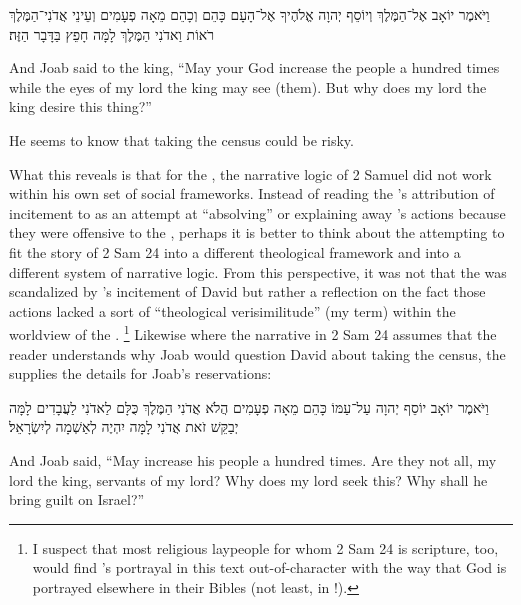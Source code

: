 \begin{hebrewtext}
    וַיֹּאמֶר יוֹאָב אֶל־הַמֶּלֶךְ וְיוֹסֵף יְהוָה אֱלֹהֶיךָ אֶל־הָעָם כָּהֵם וְכָהֵם מֵאָה פְעָמִים וְעֵינֵי אֲדֹנִי־הַמֶּלֶךְ רֹאוֹת וַאדֹנִי הַמֶּלֶךְ לָמָּה חָפֵץ בַּדָּבָר הַזֶּה׃
\end{hebrewtext}
\begin{translation}
    And Joab said to the king, ``May \yahweh your God increase the people a hundred times while the eyes of my lord the king may see (them). But why does my lord the king desire this thing?''
\end{translation}
\noindent
He seems to know that taking the census could be risky. 

What this reveals is that for the \chronicler, the narrative logic of 2 Samuel did not work within his own set of social frameworks. Instead of reading the \chronicler's attribution of incitement to  as an attempt at ``absolving'' or explaining away \yahweh's actions because they were offensive to the \chronicler, perhaps it is better to think about the \chronicler attempting to fit the story of 2 Sam 24 into a different theological framework and into a different system of narrative logic. From this perspective, it was not that the \chronicler was scandalized by \yahweh's incitement of David but rather a reflection on the fact those actions lacked a sort of ``theological verisimilitude'' (my term) within the worldview of the \chronicler.%
    \footnote{I suspect that most religious laypeople for whom 2 Sam 24 is scripture, too, would find \yahweh's portrayal in this text out-of-character with the way that God is portrayed elsewhere in their Bibles (not least, in \chronicles!).}
Likewise where the narrative in 2 Sam 24 assumes that the reader understands why Joab would question David about taking the census, the \chronicler supplies the details for Joab's reservations:
\begin{hebrewtext}
    וַיֹּאמֶר יוֹאָב יוֹסֵף יְהוָה עַל־עַמּוֹ כָּהֵם מֵאָה פְעָמִים הֲלֹא אֲדֹנִי הַמֶּלֶךְ כֻּלָּם לַאדֹנִי לַעֲבָדִים לָמָּה יְבַקֵּשׁ זֹאת אֲדֹנִי לָמָּה יִהְיֶה לְאַשְׁמָה לְיִשְׂרָאֵל׃
\end{hebrewtext}
\begin{translation}
    And Joab said, ``May \yahweh increase his people a hundred times. Are they not all, my lord the king, servants of my lord? Why does my lord seek this? Why shall he bring guilt on Israel?''
\end{translation}
